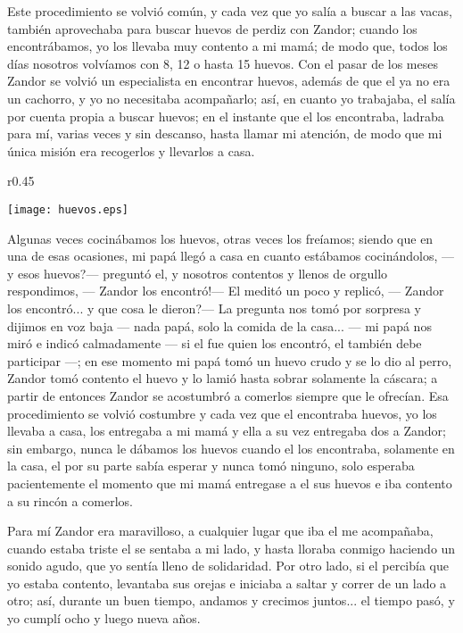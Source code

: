 Este procedimiento se volvió común, y cada vez que yo salía a buscar a las vacas, también aprovechaba para buscar huevos de perdiz con Zandor; cuando los encontrábamos,  yo los llevaba muy contento a mi mamá; de modo que, todos los días nosotros volvíamos con 8, 12 o hasta 15 huevos.
Con el pasar de los meses Zandor se volvió un especialista en encontrar huevos, además de que el ya no era un cachorro, y yo no necesitaba acompañarlo; así, en cuanto yo trabajaba, el salía por cuenta propia a buscar huevos; en el instante que el los encontraba, ladraba para mí, varias veces y sin descanso, hasta llamar mi atención, de modo que mi única misión era recogerlos y llevarlos a casa.
\begin{wrapfigure}{r}{0.45\textwidth}
  \begin{center}
  \vspace{-20pt}
    \texttt{[image: huevos.eps]}
  \end{center}
  \vspace{-20pt}
\end{wrapfigure}
Algunas veces cocinábamos los huevos, otras veces los freíamos; siendo que en una de esas ocasiones, mi papá llegó a casa en cuanto estábamos cocinándolos, --- y esos huevos?--- preguntó el, y nosotros contentos y llenos de orgullo respondimos, --- Zandor los encontró!---
El meditó un poco y replicó, --- Zandor los encontró... y que cosa le dieron?--- La pregunta nos tomó por sorpresa y dijimos en voz baja --- nada papá, solo la comida de la casa... --- mi papá nos miró e indicó calmadamente --- si el fue quien los encontró, el también debe participar ---;
en ese momento mi papá tomó un huevo crudo y se lo dio al perro, Zandor tomó contento el huevo y lo lamió hasta sobrar solamente la cáscara; a partir de entonces Zandor se acostumbró a comerlos siempre que le ofrecían. Esa procedimiento se volvió costumbre y cada vez que el encontraba huevos, yo los llevaba a casa, los entregaba a mi mamá y ella a su vez entregaba dos a Zandor; sin embargo, nunca le dábamos los huevos cuando el los encontraba, solamente en la casa, el por su parte sabía esperar y nunca tomó ninguno, solo esperaba pacientemente el momento que mi mamá entregase a el sus huevos e iba contento a su rincón a comerlos.

Para mí Zandor era maravilloso, a cualquier lugar que iba el me acompañaba, cuando estaba triste el se sentaba a mi lado, y hasta lloraba conmigo haciendo un sonido agudo, que yo sentía lleno de solidaridad.
Por otro lado, si el percibía que yo estaba contento, levantaba sus orejas e iniciaba a saltar y correr de un lado a otro; así, durante un buen tiempo, andamos y crecimos juntos... el tiempo pasó, y yo cumplí ocho y luego nueva años.

